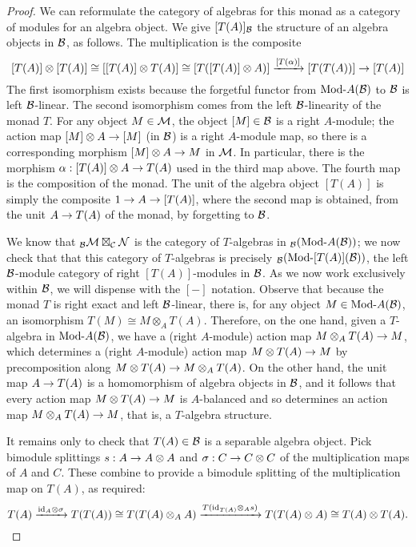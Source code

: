 \documentclass{amsart}
\begin{document}
\begin{proof}
We can reformulate the category of algebras for this monad as a category of modules for an algebra object.  We give $[T(A)]_\mathcal B$ the structure of an algebra objects in $\mathcal B$, as follows.  The multiplication is the composite
\[
[T(A)] \otimes [T(A)] \cong [[T(A)] \otimes T(A)] \cong [T([T(A)] \otimes A)] \xrightarrow{[T(\alpha)]} [T(T(A))] \rightarrow [T(A)]
\]
The first isomorphism exists because the forgetful functor from $\Mod{}{A}(\cB)$ to $\mathcal B$ is left $\mathcal B$-linear.  The second isomorphism comes from the left $\mathcal B$-linearity of the monad $T$.  For any object $M \in \mathcal M$, the object $[M] \in \mathcal B$ is a right $A$-module; the action map $[M] \otimes A \rightarrow [M]$ (in $\mathcal B$) is a right $A$-module map, so there is a corresponding morphism $[M] \otimes A \rightarrow M$ in $\mathcal M$.  In particular, there is the morphism $\alpha: [T(A)] \otimes A \rightarrow T(A)$ used in the third map above.  The fourth map is the composition of the monad.  The unit of the algebra object $[T(A)]$ is simply the composite $1 \rightarrow A \rightarrow [T(A)]$, where the second map is obtained, from the unit $A \rightarrow T(A)$ of the monad, by forgetting to $\mathcal B$.

We know that ${}_\mathcal B \mathcal M \boxtimes_\mathcal C \mathcal N$ is the category of $T$-algebras in ${}_\cB (\Mod{}{A}(\cB))$; we now check that that this category of $T$-algebras is precisely ${}_\cB (\Mod{}{[T(A)]}(\cB))$, the left $\mathcal B$-module category of right $[T(A)]$-modules in $\mathcal B$.  As we now work exclusively within $\mathcal B$, we will dispense with the $[-]$ notation.  Observe that because the monad $T$ is right exact and left $\mathcal B$-linear, there is, for any object $M \in \Mod{}{A}(\cB)$, an isomorphism $T(M) \cong M \otimes_A T(A)$.  Therefore, on the one hand, given a $T$-algebra in $\Mod{}{A}(\cB)$, we have a (right $A$-module) action map $M \otimes_A T(A) \rightarrow M$, which determines a (right $A$-module) action map $M \otimes T(A) \rightarrow M$ by precomposition along $M \otimes T(A) \rightarrow M \otimes_A T(A)$.  On the other hand, the unit map $A \rightarrow T(A)$ is a homomorphism of algebra objects in $\mathcal B$, and it follows that every action map $M \otimes T(A) \rightarrow M$ is $A$-balanced and so determines an action map $M \otimes_A T(A) \rightarrow M$, that is, a $T$-algebra structure.

It remains only to check that $T(A) \in \mathcal B$ is a separable algebra object.  Pick bimodule splittings $s: A \rightarrow A \otimes A$ and $\sigma: C \rightarrow C \otimes C$ of the multiplication maps of $A$ and $C$.  These combine to provide a bimodule splitting of the multiplication map on $T(A)$, as required:
\[
T(A) \xrightarrow{\mathrm{id}_A \otimes \sigma} T(T(A)) \cong T(T(A) \otimes_A A) \xrightarrow{T(\mathrm{id}_{T(A)} \otimes_A s)} T(T(A) \otimes A) \cong T(A) \otimes T(A). \qedhere
\]

\end{proof}
\end{document}
